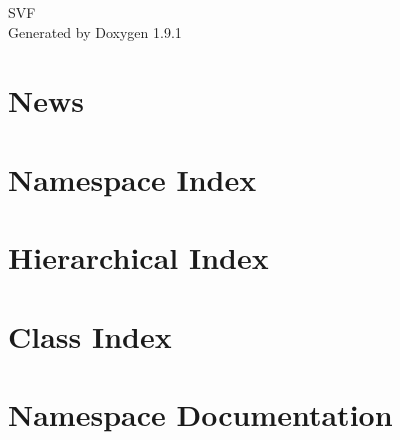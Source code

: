\let\mypdfximage\pdfximage\def\pdfximage{\immediate\mypdfximage}\documentclass[twoside]{book}
\newcommand{\+}{\discretionary{\mbox{\scriptsize$\hookleftarrow$}}{}{}}
\newcommand{\clearemptydoublepage}{%
  \newpage{\pagestyle{empty}\cleardoublepage}%
}
\begin{document}
\raggedbottom

\hypersetup{pageanchor=false,
             bookmarksnumbered=true,
             pdfencoding=unicode
            }
\begin{titlepage}
\vspace*{7cm}
\begin{center}%
{\Large SVF }\\
\vspace*{1cm}
{\large Generated by Doxygen 1.9.1}\\
\end{center}
\end{titlepage}
\clearemptydoublepage
{}
\tableofcontents
\clearemptydoublepage
{}
\hypersetup{pageanchor=true}

\chapter{News}
\label{md__r_e_a_d_m_e}

\chapter{Namespace Index}

\chapter{Hierarchical Index}

\chapter{Class Index}

\chapter{Namespace Documentation}



\end{document}
